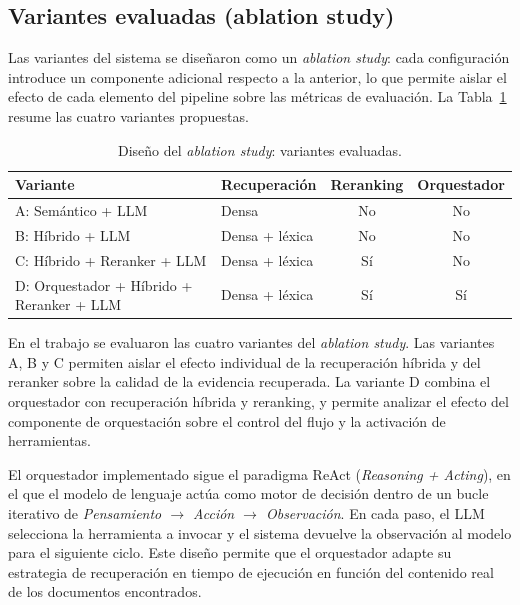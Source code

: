 \subsection{Variantes evaluadas (ablation study)}\label{subsec:variantes-evaluadas}

Las variantes del sistema se diseñaron como un \textit{ablation study}: cada configuración introduce un componente adicional respecto a la anterior, lo que permite aislar el efecto de cada elemento del pipeline sobre las métricas de evaluación. 
La Tabla~\ref{tab:variantes-evaluadas} resume las cuatro variantes propuestas.

\begin{table}[H]
\centering
\small
\begin{tabular}{llcc}
\toprule
\textbf{Variante} & \textbf{Recuperación} & \textbf{Reranking} & \textbf{Orquestador} \\
\midrule
A: Semántico + LLM                        & Densa          & No & No \\
B: Híbrido + LLM                          & Densa + léxica & No & No \\
C: Híbrido + Reranker + LLM               & Densa + léxica & Sí & No \\
D: Orquestador + Híbrido + Reranker + LLM & Densa + léxica & Sí & Sí \\
\bottomrule
\end{tabular}
\caption{Diseño del \textit{ablation study}: variantes evaluadas.}
\label{tab:variantes-evaluadas}
\end{table}

En el trabajo se evaluaron las cuatro variantes del \textit{ablation study}. 
Las variantes A, B y C permiten aislar el efecto individual de la recuperación híbrida y del reranker sobre la calidad de la evidencia recuperada. 
La variante D combina el orquestador con recuperación híbrida y reranking, y permite analizar el efecto del componente de orquestación sobre el control del flujo y la activación de herramientas.

El orquestador implementado sigue el paradigma ReAct \cite{yao2023react} (\textit{Reasoning + Acting}), en el que el modelo de lenguaje actúa como motor de decisión dentro de un bucle iterativo de \textit{Pensamiento $\to$ Acción $\to$ Observación}.
En cada paso, el LLM selecciona la herramienta a invocar y el sistema devuelve la observación al modelo para el siguiente ciclo.
Este diseño permite que el orquestador adapte su estrategia de recuperación en tiempo de ejecución en función del contenido real de los documentos encontrados.

